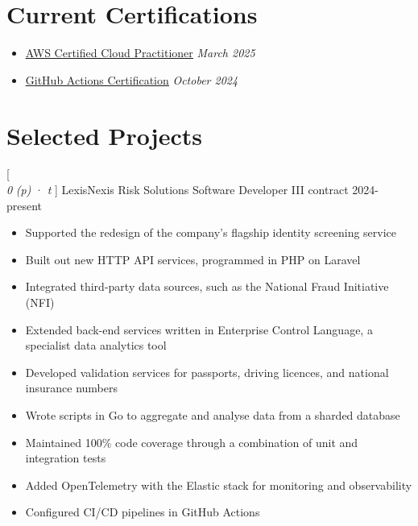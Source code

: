 \documentclass[a4paper,10pt]{article}
\newcommand{\link}[2]{
  \textcolor{link}{\uline{\href{#1}{#2}}}
}
\newcommand{\resumeHeading}[1]{
  \section*{#1}
}
\newcommand{\resumeSubheading}[5][12pt]{
  \vspace{#1}
  {\scshape{#2}} \\
  \textit{\small{#3}} \textit{\small{(#4)}} · \textit{\small{#5}}
  \vspace{2pt}
}
\newcommand{\resumeListStart}{\begin{itemize}}
\newcommand{\resumeListEnd}{\end{itemize}}
\newcommand{\resumeItem}[1]{
  \item[\-·]\small{{#1\vspace{1pt}}}
}
\begin{document}
  \begin{minipage}{\textwidth}
    \resumeHeading{Current Certifications}

    \resumeListStart
      \resumeItem{\link{https://www.credly.com/badges/9801eabb-75e4-4533-a63b-4560c0abae49/}{AWS Certified Cloud Practitioner} \hfill \textit{March 2025}}
      \resumeItem{\link{https://www.credly.com/badges/4ffff536-6b68-40b1-8686-5ffd7f548447/}{GitHub Actions Certification} \hfill \textit{October 2024}}
    \resumeListEnd
  \end{minipage}

  \begin{minipage}{\textwidth}
    \resumeHeading{Selected Projects}

    \resumeSubheading
      [0pt]  %
      {LexisNexis Risk Solutions}
      {Software Developer III}
      {contract}
      {2024-present}
    \resumeListStart
      \resumeItem{Supported the redesign of the company's flagship identity screening service}
      \resumeItem{Built out new HTTP API services, programmed in PHP on Laravel}
      \resumeItem{Integrated third-party data sources, such as the National Fraud Initiative (NFI)}
      \resumeItem{Extended back-end services written in Enterprise Control Language, a specialist data analytics tool}
      \resumeItem{Developed validation services for passports, driving licences, and national insurance numbers}
      \resumeItem{Wrote scripts in Go to aggregate and analyse data from a sharded database}
      \resumeItem{Maintained 100\% code coverage through a combination of unit and integration tests}
      \resumeItem{Added OpenTelemetry with the Elastic stack for monitoring and observability}
      \resumeItem{Configured CI/CD pipelines in GitHub Actions}
    \resumeListEnd
  \end{minipage}


\end{document}
